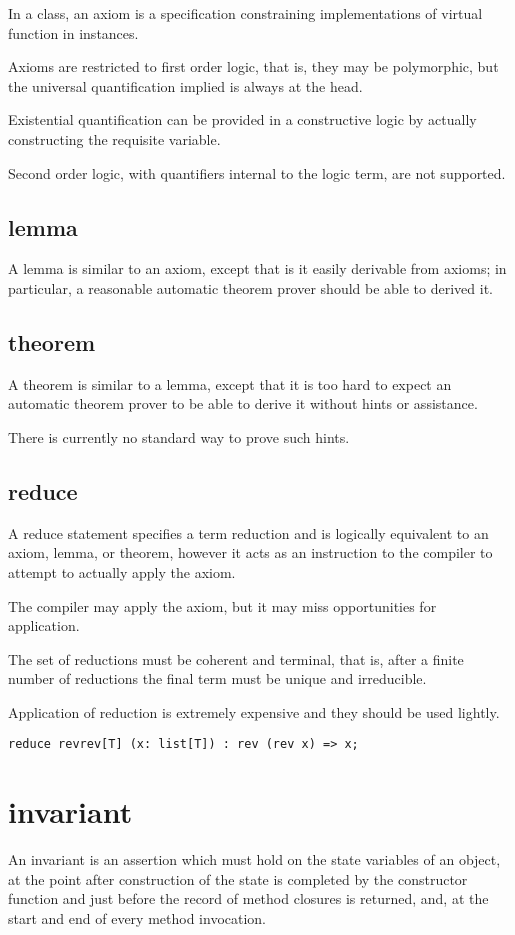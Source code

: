 \documentclass[oneside]{book}
\begin{document}
{In a class, an axiom is a specification constraining
implementations of virtual function in instances.

Axioms are restricted to first order logic, that is, they
may be polymorphic, but the universal quantification implied
is always at the head.

Existential quantification can be provided in a constructive
logic by actually constructing the requisite variable.

Second order logic, with quantifiers internal to the 
logic term, are not supported.

\subsection{lemma}
A lemma is similar to an axiom, except that is it
easily derivable from axioms; in particular,
a reasonable automatic theorem prover should
be able to derived it.

\subsection{theorem}
A theorem is similar to a lemma, except that it is 
too hard to expect an automatic theorem prover
to be able to derive it without hints or assistance.

There is currently no standard way to prove such hints.

\subsection{reduce}
A reduce statement specifies a term reduction and is logically
equivalent to an axiom, lemma, or theorem, however it acts
as an instruction to the compiler to attempt to actually 
apply the axiom.

The compiler may apply the axiom, but it may miss opportunities
for application.

The set of reductions must be coherent and terminal, 
that is, after a finite number of reductions the final
term must be unique and irreducible. 

Application of reduction is extremely expensive and they
should be used lightly.

\begin{verbatim}
reduce revrev[T] (x: list[T]) : rev (rev x) => x;
\end{verbatim}



\section{invariant}
An invariant is an assertion which must hold on the state variables
of an object, at the point after construction of the state
is completed by the constructor function and just before the
record of method closures is returned, and, at the start and
end of every method invocation.

}
\end{document}
